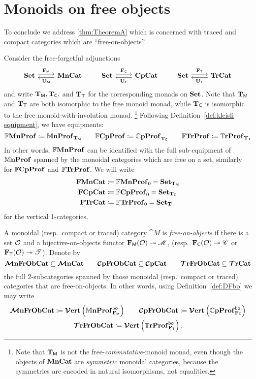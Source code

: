 \documentclass[11pt,oneside,article]{memoir}
\begin{document}
\section{Monoids on free objects}
      \label{sec:monoids_on_free}

To conclude we address \ref{thm:TheoremA} which is concerned with traced and compact categories which are ``free-on-objects''.

Consider the free-forgetful adjunctions
\begin{equation}
   \label{eqn:adjunctions}
   \Adjoint{\Set}{\MonCat}{\FM}{\UM}
   \qquad
   \Adjoint{\Set}{\CompCat}{\FC}{\UC}
   \qquad
   \Adjoint{\Set}{\TrCat}{\FT}{\UT}
\end{equation}
and write $\mathbf{T}_{\mathsf{M}},\mathbf{T}_{\mathsf{C}},$ and $\mathbf{T}_{\mathsf{T}}$ for the corresponding monads on $\mathbf{Set}$. Note that $\mathbf{T}_{\mathsf{M}}$ and $\mathbf{T}_{\mathsf{T}}$ are both isomorphic to the free monoid monad, while $\mathbf{T}_{\mathsf{C}}$ is isomorphic to the free monoid-with-involution monad.%
\footnote{
   Note that $\mathbf{T}_{\mathsf{M}}$ is not the free-\emph{commutative}-monoid monad, even though the objects of
   $\mathbf{MnCat}$ are \emph{symmetric} monoidal categories, because the symmetries are encoded in natural
   isomorphisms, not equalities.
}
Following Definition~\ref{def:kleisli equipment}, we have equipments:
\[
   \mathbb{F}\mathbf{MnProf}  \coloneqq \mathbb{M}\mathbf{nProf}_{\mathbf{T}_{\mathsf{M}}}
   \qquad
   \mathbb{F}\mathbf{CpProf} \coloneqq \mathbb{C}\mathbf{pProf}_{\mathbf{T}_{\mathsf{C}}}
   \qquad
   \mathbb{F}\mathbf{TrProf}   \coloneqq \mathbb{T}\mathbf{rProf}_{\mathbf{T}_{\mathsf{T}}} 
\]
In other words, $\mathbb{F}\mathbf{MnProf}$ can be identified with the full sub-equipment of $\mathbb{M}\mathbf{nProf}$ spanned by the monoidal categories which are free on a set, similarly for $\mathbb{F}\mathbf{CpProf}$ and $\mathbb{F}\mathbf{TrProf}$. We will write 
\begin{align*}
   \mathbf{FMnCat}&\coloneqq\mathbb{F}\mathbf{MnProf}_0=\mathbf{Set}_{\mathbf{T}_{\mathsf{M}}}\\
   \mathbf{FCpCat}&\coloneqq\mathbb{F}\mathbf{CpProf}_0=\mathbf{Set}_{\mathbf{T}_{\mathsf{C}}}\\
   \mathbf{FTrCat}&\coloneqq\mathbb{F}\mathbf{TrProf}_0=\mathbf{Set}_{\mathbf{T}_{\mathsf{T}}}
\end{align*}
for the vertical 1-categories.

\begin{definition}
      \label{def:free_on_objects}
   A monoidal (resp.\ compact or traced) category $\cat{M}$ is \emph{free-on-objects} if there is a
   set $\mathcal{O}$ and a bijective-on-objects functor $\mathbf{F}_{\mathsf{M}}(\mathcal{O})\twoheadrightarrow\mathscr{M}$, (resp.\
   $\mathbf{F}_{\mathsf{C}}(\mathcal{O})\twoheadrightarrow\mathscr{C}$ or $\mathbf{F}_{\mathsf{T}}(\mathcal{O})\twoheadrightarrow\mathscr{T}$). Denote by
   \[
      \bm{\mathcal{M}}\mathbf{nFrObCat}\subseteq\bm{\mathcal{M}}\mathbf{nCat}\qquad\bm{\mathcal{C}}\mathbf{pFrObCat}\subseteq\bm{\mathcal{C}}\mathbf{pCat}\qquad\bm{\mathcal{T}}\mathbf{rFrObCat}\subseteq\bm{\mathcal{T}}\mathbf{rCat}
   \]
   the full 2-subcategories spanned by those monoidal (resp.\ compact or traced) categories
   that are free-on-objects. In other words, using Definition~\ref{def:DFbo} we may write
   \begin{gather*}
      \bm{\mathcal{M}}\mathbf{nFrObCat} \coloneqq \bm{\mathcal{V}}\mathbf{ert}\left(\mathbb{M}\mathbf{nProf}_{\mathbf{F}_{\mathsf{M}}}^{\mathsf{bo}}\right) \qquad
      \bm{\mathcal{C}}\mathbf{pFrObCat} \coloneqq \bm{\mathcal{V}}\mathbf{ert}\left(\mathbb{C}\mathbf{pProf}_{\mathbf{F}_{\mathsf{C}}}^{\mathsf{bo}}\right) \\
      \bm{\mathcal{T}}\mathbf{rFrObCat} \coloneqq \bm{\mathcal{V}}\mathbf{ert}\left(\mathbb{T}\mathbf{rProf}_{\mathbf{F}_{\mathsf{T}}}^{\mathsf{bo}}\right).
   \end{gather*}
\end{definition}
\end{document}
